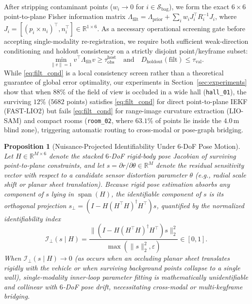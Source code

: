 \documentclass[journal]{IEEEtran}
\newtheorem{proposition}{Proposition}
\begin{document}
After stripping contaminant points ($w_i \to 0$ for $i \in \mathcal{S}_{\mathrm{bag}}$), we form the exact $6\times 6$ point-to-plane Fisher information matrix $\Lambda_{\mathrm{filt}} = \Lambda_{\mathrm{prior}} + \sum_{i} w_i J_i^\top R_i^{-1} J_i$, where $J_i = [(p_i \times n_i)^\top, n_i^\top] \in \mathbb{R}^{1\times 6}$. As a necessary operational screening gate before accepting single-modality re-registration, we require both sufficient weak-direction conditioning and holdout consistency on a strictly disjoint point/keyframe subset:
\begin{equation}
    \min_{\|v\|=1} v^\top \Lambda_{\mathrm{filt}} v \ge \tau_{\mathrm{obs}}^{\mathrm{host}} \quad \text{and} \quad D_{\mathrm{holdout}}(\mathrm{filt}) \le \tau_{\mathrm{val}}.
    \label{eq:filt_cond}
\end{equation}
While \eqref{eq:filt_cond} is a local consistency screen rather than a theoretical guarantee of global error optimality, our experiments in Section~\ref{sec:experiments} show that when $88\%$ of the field of view is occluded in a wide hall (\texttt{hall\_01}), the surviving $12\%$ ($5682$ points) satisfies \eqref{eq:filt_cond} for direct point-to-plane IEKF (FAST-LIO2) but fails \eqref{eq:filt_cond} for range-image curvature extraction (LIO-SAM) and compact rooms (\texttt{room\_02}, where $63.1\%$ of points lie inside the $4.0\,\mathrm{m}$ blind zone), triggering automatic routing to cross-modal or pose-graph bridging.

\begin{proposition}[Nuisance-Projected Identifiability Under 6-DoF Pose Motion]
\label{prop:identifiability}
Let $H \in \mathbb{R}^{M\times 6}$ denote the stacked $6$-DoF rigid-body pose Jacobian of surviving point-to-plane constraints, and let $s = \partial r / \partial \theta \in \mathbb{R}^M$ denote the residual sensitivity vector with respect to a candidate sensor distortion parameter $\theta$ (e.g., radial scale shift or planar sheet translation). Because rigid pose estimation absorbs any component of $s$ lying in $\operatorname{span}(H)$, the identifiable component of $s$ is its orthogonal projection $s_\perp = (I - H(H^\top H)^\dagger H^\top)s$, quantified by the normalized identifiability index
\begin{equation}
    \mathcal{I}_\perp(s \mid H) = \frac{\|(I - H(H^\top H)^\dagger H^\top) s\|_2^2}{\max(\|s\|_2^2, \varepsilon)} \in [0, 1].
    \label{eq:identifiability}
\end{equation}
When $\mathcal{I}_\perp(s \mid H) \to 0$ (as occurs when an occluding planar sheet translates rigidly with the vehicle or when surviving background points collapse to a single wall), single-modality inner-loop parameter fitting is mathematically unidentifiable and collinear with $6$-DoF pose drift, necessitating cross-modal or multi-keyframe bridging.
\end{proposition}
\end{document}
